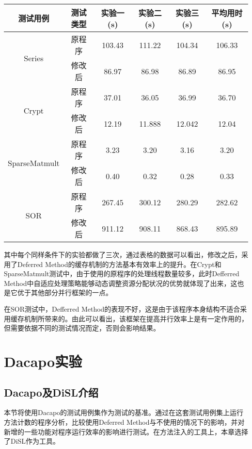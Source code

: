 \begin{table}[htbp]
	\centering
	\begin{tabular}{c|c|c|c|c|c}
		\hline
		测试用例 & 测试类型 & 实验一(s) & 实验二(s) & 实验三(s) & 平均用时(s) \\
		\hline
		\multirow{2}{*}{Series} & 原程序 & 103.43 & 111.22 & 104.34 & 106.33 \\
		\cline{2-6}
		& 修改后 & 86.97 & 86.98 & 86.89 &86.95 \\
		\hline
		\multirow{2}{*}{Crypt} & 原程序 & 37.01 & 36.05 & 36.99 & 36.70 \\
		\cline{2-6}
		& 修改后 & 12.19 & 11.888 & 12.042 &12.04 \\
		\hline
		\multirow{2}{*}{SparseMatmult} & 原程序 & 3.23 & 3.20 & 3.16 & 3.20 \\
		\cline{2-6}
		& 修改后 & 0.40 & 0.32 & 0.28 & 0.33 \\
		\hline
		\multirow{2}{*}{SOR} & 原程序 & 267.45 & 300.12 & 280.29 & 282.62 \\
		\cline{2-6}
		& 修改后 & 911.12 & 908.11 & 868.43 & 895.89 \\
		\hline
	\end{tabular}
\end{table}

其中每个同样条件下的实验都做了三次，通过表格的数据可以看出，修改之后，采用了Deferred Method的缓存机制的方法基本有效率上的提升。在Crypt和SparseMatmult测试中，由于使用的原程序的处理线程数量较多，此时Defferred Method中自适应处理策略能够动态调整资源分配状况的优势就体现了出来，这也是它优于其他部分并行框架的一点。

在SOR测试中，Defferred Method的表现不好，这是由于该程序本身结构不适合采用缓存机制所带来的。由此可以看出，该框架在提高并行效率上是有一定作用的，但需要依据不同的测试情况而定，否则会影响结果。

\section{Dacapo实验}

\subsection{Dacapo及DiSL介绍}

本节将使用Dacapo的测试用例集作为测试的基准。通过在这套测试用例集上运行方法计数的程序分析，比较使用Deferred Method与不使用的情况下的影响，并对新增的一些功能对程序运行效率的影响进行测试。在方法注入的工具上，本章选择了DiSL作为工具。

